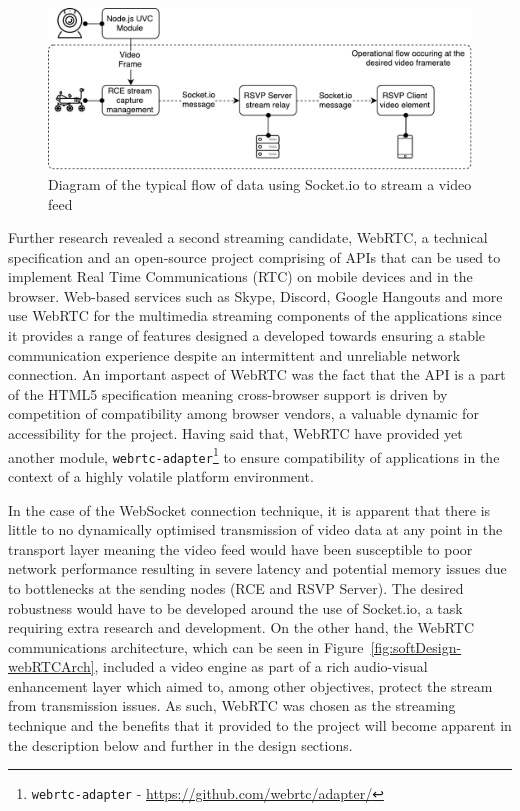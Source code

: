       \begin{figure}[h!]
        \centering
        \includegraphics[width=0.8\linewidth]{figures/softDesign-socketVideoStreaming}
        \caption[Diagram of the typical flow of data using Socket.io to stream a video feed]{Diagram of the typical flow of data using Socket.io to stream a video feed}
        \label{fig:softDesign-socketVideoStreaming}
      \end{figure}
      
      Further research revealed a second streaming candidate, WebRTC, a technical specification and an open-source project comprising of APIs that can be used to implement Real Time Communications (RTC) on mobile devices and in the browser. Web-based services such as Skype, Discord, Google Hangouts and more use WebRTC for the multimedia streaming components of the applications since it provides a range of features designed a developed towards ensuring a stable communication experience despite an intermittent and unreliable network connection. An important aspect of WebRTC was the fact that the API is a part of the HTML5 specification meaning cross-browser support is driven by competition of compatibility among browser vendors, a valuable dynamic for accessibility for the project. Having said that, WebRTC have provided yet another module, \texttt{webrtc-adapter}\footnote{\texttt{webrtc-adapter} - \url{https://github.com/webrtc/adapter/}} to ensure compatibility of applications in the context of a highly volatile platform environment.
      
      In the case of the WebSocket connection technique, it is apparent that there is little to no dynamically optimised transmission of video data at any point in the transport layer meaning the video feed would have been susceptible to poor network performance resulting in severe latency and potential memory issues due to bottlenecks at the sending nodes (RCE and RSVP Server). The desired robustness would have to be developed around the use of Socket.io, a task requiring extra research and development. On the other hand, the WebRTC communications architecture, which can be seen in Figure~\ref{fig:softDesign-webRTCArch}, included a video engine as part of a rich audio-visual enhancement layer which aimed to, among other objectives, protect the stream from transmission issues. As such, WebRTC was chosen as the streaming technique and the benefits that it provided to the project will become apparent in the description below and further in the design sections.
      
